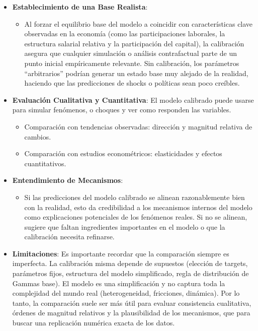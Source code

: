 \documentclass{article}
\theoremstyle{remark}
\theoremstyle{definition}
\begin{document}
\begin{enumerate}
\begin{tcolorbox}[title= Soluci\'on 6]
\begin{itemize}
    \item \textbf{Establecimiento de una Base Realista}:
    \begin{itemize}
        \item Al forzar el equilibrio base del modelo a coincidir con características clave observadas en la economía (como las participaciones laborales, la estructura salarial relativa y la participación del capital), la calibración asegura que cualquier simulación o análisis contrafactual parte de un punto inicial empíricamente relevante. Sin calibración, los parámetros ``arbitrarios'' podrían generar un estado base muy alejado de la realidad, haciendo que las predicciones de shocks o políticas sean poco creíbles.
    \end{itemize}

    \item \textbf{Evaluación Cualitativa y Cuantitativa}: El modelo calibrado puede usarse para simular fen\'omenos, o choques y ver como responden las variables.
    \begin{itemize}
        \item Comparación con tendencias observadas: dirección y magnitud relativa de cambios.
        \item Comparación con estudios econométricos: elasticidades y efectos cuantitativos.
    \end{itemize}

    \item \textbf{Entendimiento de Mecanismos}:
    \begin{itemize}
        \item Si las predicciones del modelo calibrado se alinean razonablemente bien con la realidad, esto da credibilidad a los mecanismos internos del modelo como explicaciones potenciales de los fenómenos reales. Si no se alinean, sugiere que faltan ingredientes importantes en el modelo o que la calibración necesita refinarse.
    \end{itemize}

    \item \textbf{Limitaciones}: Es importante recordar que la comparación siempre es imperfecta. La calibración misma depende de supuestos (elección de targets, parámetros fijos, estructura del modelo simplificado, regla de distribución de Gammas base). El modelo es una simplificación y no captura toda la complejidad del mundo real (heterogeneidad, fricciones, dinámica). Por lo tanto, la comparación suele ser más útil para evaluar consistencia cualitativa, órdenes de magnitud relativos y la plausibilidad de los mecanismos, que para buscar una replicación numérica exacta de los datos.
\end{itemize}


\end{tcolorbox}
\end{enumerate}
\end{document}
